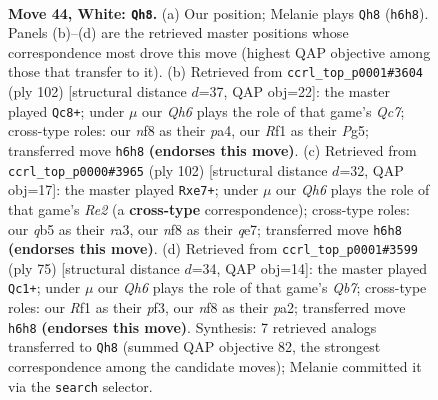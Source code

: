\documentclass[11pt]{article}
\begin{document}
\clearpage

\begin{figure}[p]\centering
\begin{subfigure}{0.46\textwidth}\centering
\resizebox{\linewidth}{!}{%
\newchessgame
\chessboard[
  setfen={4kn2/8/7Q/pqp5/8/1P6/P7/5RK1 w - - 4 44},
  showmover=false,
  pgfstyle=straightmove, color=movearrow, markmove={h6-h8}
]}
\caption{}
\end{subfigure}\hfill
\begin{subfigure}{0.46\textwidth}\centering
\resizebox{\linewidth}{!}{%
\newchessgame
\chessboard[
  setfen={5k2/2Q5/4p1p1/5qP1/p7/3P4/5P2/4K3 w - - 10 52},
  showmover=false,
  pgfstyle=straightmove, color=movearrow, markmove={c7-c8}
]}
\caption{}
\end{subfigure}
\\[4pt]
\begin{subfigure}{0.46\textwidth}\centering
\resizebox{\linewidth}{!}{%
\newchessgame
\chessboard[
  setfen={8/4q2k/6p1/7p/8/r5PP/4R2K/8 w - - 0 52},
  showmover=false,
  pgfstyle=straightmove, color=movearrow, markmove={e2-e7}
]}
\caption{}
\end{subfigure}\hfill
\begin{subfigure}{0.46\textwidth}\centering
\resizebox{\linewidth}{!}{%
\newchessgame
\chessboard[
  setfen={6k1/5p2/Q5p1/8/7P/5P2/Pq6/5K2 b - - 0 38},
  showmover=false,
  pgfstyle=straightmove, color=movearrow, markmove={b2-c1}
]}
\caption{}
\end{subfigure}
\caption{\textbf{Move 44, White: \texttt{Qh8}.} (a) Our position; Melanie plays \texttt{Qh8} (\texttt{h6h8}). Panels (b)--(d) are the retrieved master positions whose correspondence most drove this move (highest QAP objective among those that transfer to it). (b) Retrieved from \texttt{ccrl\_top\_p0001\#3604} (ply 102) [structural distance $d$=37, QAP obj=22]: the master played \texttt{Qc8+}; under $\mu$ our \emph{Qh6} plays the role of that game's \emph{Qc7}; cross-type roles: our \emph{n}f8 as their \emph{p}a4, our \emph{R}f1 as their \emph{P}g5; transferred move \texttt{h6h8} \textbf{(endorses this move)}. (c) Retrieved from \texttt{ccrl\_top\_p0000\#3965} (ply 102) [structural distance $d$=32, QAP obj=17]: the master played \texttt{Rxe7+}; under $\mu$ our \emph{Qh6} plays the role of that game's \emph{Re2} (a \textbf{cross-type} correspondence); cross-type roles: our \emph{q}b5 as their \emph{r}a3, our \emph{n}f8 as their \emph{q}e7; transferred move \texttt{h6h8} \textbf{(endorses this move)}. (d) Retrieved from \texttt{ccrl\_top\_p0001\#3599} (ply 75) [structural distance $d$=34, QAP obj=14]: the master played \texttt{Qc1+}; under $\mu$ our \emph{Qh6} plays the role of that game's \emph{Qb7}; cross-type roles: our \emph{R}f1 as their \emph{p}f3, our \emph{n}f8 as their \emph{p}a2; transferred move \texttt{h6h8} \textbf{(endorses this move)}. Synthesis: 7 retrieved analogs transferred to \texttt{Qh8} (summed QAP objective 82, the strongest correspondence among the candidate moves); Melanie committed it via the \texttt{search} selector.}
\label{fig:thought-m86}
\end{figure}
\end{document}
